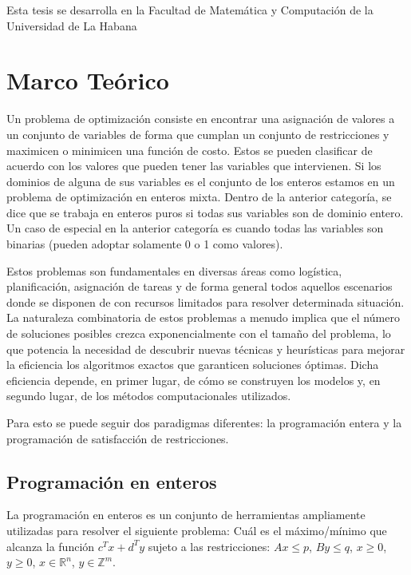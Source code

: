 \documentclass[12pt]{report}
\begin{document}
Esta tesis se desarrolla en la Facultad de Matemática y Computación de la Universidad de La Habana  \\

\chapter{Marco Teórico}

Un problema de optimización consiste en encontrar una asignación de valores a un conjunto de variables de forma que cumplan un conjunto de restricciones y maximicen o minimicen una función de costo. Estos se pueden clasificar de acuerdo con los valores que pueden tener las variables que intervienen. Si los dominios de alguna de sus variables es el conjunto de los enteros estamos en un problema de optimización en enteros mixta. Dentro de la anterior categoría, se dice que se trabaja en enteros puros si todas sus variables son de dominio entero. Un caso de especial en la anterior categoría es cuando todas las variables son binarias (pueden adoptar solamente 0 o 1 como valores).

Estos problemas son fundamentales en diversas áreas como logística, planificación, asignación de tareas y de forma general todos aquellos escenarios donde se disponen de con recursos limitados para resolver determinada situación. La naturaleza combinatoria de estos problemas a menudo implica que el número de soluciones posibles crezca exponencialmente con el tamaño del problema, lo que potencia la necesidad de descubrir nuevas técnicas y heurísticas para mejorar la eficiencia los algoritmos exactos que garanticen soluciones óptimas. Dicha eficiencia depende, en primer lugar, de cómo se construyen los modelos y, en segundo lugar, de los métodos computacionales utilizados. 

Para esto se puede seguir dos paradigmas diferentes: la programación entera y la programación de satisfacción de restricciones.

\section{Programación en enteros}

La programación en enteros es un conjunto de herramientas ampliamente utilizadas para resolver el siguiente problema: Cuál es el máximo/mínimo que alcanza la función $c^Tx+d^Ty$ sujeto a las restricciones: $Ax\leq p$, $By\leq q$, $x\geq 0$, $y\geq 0$, $x\in \mathbb{R} ^n$, $y\in \mathbb{Z}^m$.  
\end{document}
